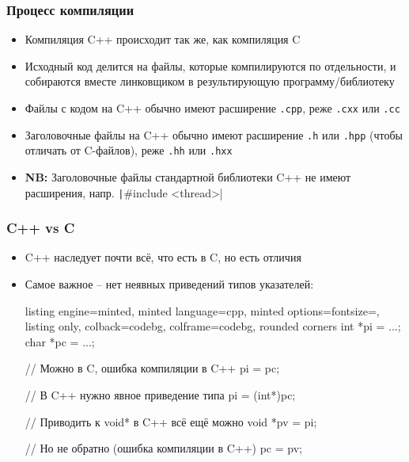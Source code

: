\documentclass[10pt]{beamer}
\begin{document}
\begin{frame}[fragile]
\frametitle{Процесс компиляции}
\begin{itemize}
\item Компиляция C++ происходит так же, как компиляция C
\pause
\item Исходный код делится на файлы, которые компилируются по отдельности, и собираются вместе линковщиком в результирующую программу/библиотеку
\pause
\item Файлы с кодом на C++ обычно имеют расширение \nolinkurl{.cpp}, реже \nolinkurl{.cxx} или \nolinkurl{.cc}
\pause
\item Заголовочные файлы на C++ обычно имеют расширение \nolinkurl{.h} или \nolinkurl{.hpp} (чтобы отличать от C-файлов), реже \nolinkurl{.hh} или \nolinkurl{.hxx}
\pause
\item \textbf{NB:} Заголовочные файлы стандартной библиотеки C++ не имеют расширения, напр. \texttt|#include <thread>|
\end{itemize}
\end{frame}

\begin{frame}[fragile]
\frametitle{C++ vs C}
\begin{itemize}
\item C++ наследует почти всё, что есть в C, но есть отличия
\pause
\item Самое важное -- нет неявных приведений типов указателей:
\begin{tcblisting}{listing engine=minted, minted language=cpp, minted options={fontsize=\scriptsize}, listing only, colback=codebg, colframe=codebg, rounded corners}
int *pi = ...;
char *pc = ...;

// Можно в C, ошибка компиляции в C++
pi = pc;

// В C++ нужно явное приведение типа
pi = (int*)pc;

// Приводить к void* в C++ всё ещё можно
void *pv = pi;

// Но не обратно (ошибка компиляции в C++)
pc = pv;
\end{tcblisting}
\end{itemize}
\end{frame}
\end{document}
